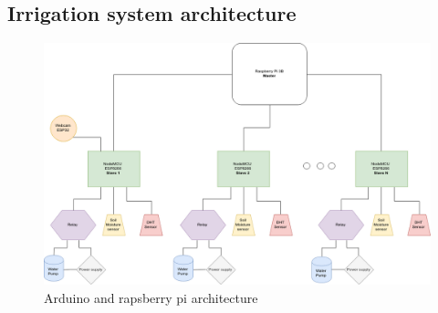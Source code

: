 \documentclass[11pt,a4paper]{article}
\begin{document}
\newpage

\subsection{Irrigation system architecture}
\begin{figure}[hbtp]
\centering
\includegraphics[scale=0.4]{figures/IrrigationSystem.png}
\caption{Arduino and rapsberry pi architecture}
\end{figure}
\end{document}
